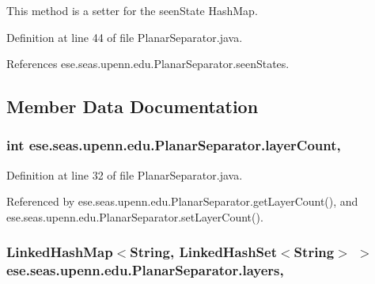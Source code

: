 This method is a setter for the seen\+State Hash\+Map. 



Definition at line 44 of file Planar\+Separator.\+java.



References ese.\+seas.\+upenn.\+edu.\+Planar\+Separator.\+seen\+States.



\subsection{Member Data Documentation}
\hypertarget{classese_1_1seas_1_1upenn_1_1edu_1_1_planar_separator_a67f579fe79d5301280c1abb4d8ce5116}{}
\subsubsection[{layer\+Count}]{\setlength{\rightskip}{0pt plus 5cm}int ese.\+seas.\+upenn.\+edu.\+Planar\+Separator.\+layer\+Count\hspace{0.3cm}{\ttfamily [static]}, {\ttfamily [private]}}\label{classese_1_1seas_1_1upenn_1_1edu_1_1_planar_separator_a67f579fe79d5301280c1abb4d8ce5116}


Definition at line 32 of file Planar\+Separator.\+java.



Referenced by ese.\+seas.\+upenn.\+edu.\+Planar\+Separator.\+get\+Layer\+Count(), and ese.\+seas.\+upenn.\+edu.\+Planar\+Separator.\+set\+Layer\+Count().

\hypertarget{classese_1_1seas_1_1upenn_1_1edu_1_1_planar_separator_a882cad4aa4f2724131bf01b09b34685c}{}
\subsubsection[{layers}]{\setlength{\rightskip}{0pt plus 5cm}Linked\+Hash\+Map$<$String, Linked\+Hash\+Set$<$String$>$ $>$ ese.\+seas.\+upenn.\+edu.\+Planar\+Separator.\+layers\hspace{0.3cm}{\ttfamily [static]}, {\ttfamily [private]}}\label{classese_1_1seas_1_1upenn_1_1edu_1_1_planar_separator_a882cad4aa4f2724131bf01b09b34685c}


